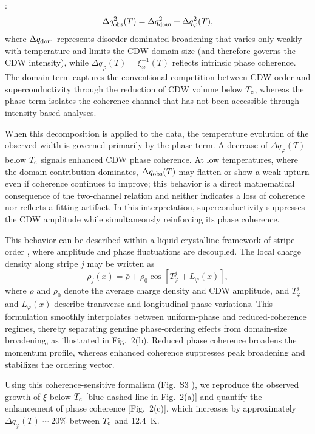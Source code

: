 \documentclass[floatfix,aps,twocolumn,preprintnumbers,superscriptaddress,floatfix,prl]{revtex4-2}
\begin{document}
\cite{supp}:
\begin{equation}
\Delta q_{\rm obs}^{2}(T)
= \Delta q_{\rm dom}^{2}
+ \Delta q_{\varphi}^{2}(T),
\end{equation}
where $\Delta q_{\rm dom}$ represents disorder-dominated broadening that varies only weakly with temperature and limits the CDW domain size (and therefore governs the CDW intensity), while $\Delta q_{\varphi}(T)=\xi_{\varphi}^{-1}(T)$ reflects intrinsic phase coherence. The domain term captures the conventional competition between CDW order and superconductivity through the reduction of CDW volume below $T_{\rm c}$, whereas the phase term isolates the coherence channel that has not been accessible through intensity-based analyses.

When this decomposition is applied to the data, the temperature evolution of the observed width is governed primarily by the phase term. A decrease of $\Delta q_{\varphi}(T)$ below $T_{\rm c}$ signals enhanced CDW phase coherence. At low temperatures, where the domain contribution dominates, $\Delta q_{\rm obs}(T)$ may flatten or show a weak upturn even if coherence continues to improve; this behavior is a direct mathematical consequence of the two-channel relation and neither indicates a loss of coherence nor reflects a fitting artifact. In this interpretation, superconductivity suppresses the CDW amplitude while simultaneously reinforcing its phase coherence.


This behavior can be described within a liquid-crystalline framework of stripe order \cite{Kivelson1,McMillan1976,TonerNelson1981,Zachar1998}, where amplitude and phase fluctuations are decoupled. The local charge density along stripe $j$ may be written as
\[
\rho_j(x)
= \bar{\rho}
+ \rho_0 \cos\!\left[T_{\varphi}^j + L_{\varphi}(x)\right],
\]
where $\bar{\rho}$ and $\rho_0$ denote the average charge density and CDW amplitude, and $T_{\varphi}^j$ and $L_{\varphi}(x)$ describe transverse and longitudinal phase variations. This formulation smoothly interpolates between uniform-phase and reduced-coherence regimes, thereby separating genuine phase-ordering effects from domain-size broadening, as illustrated in Fig.~2(b). Reduced phase coherence broadens the momentum profile, whereas enhanced coherence suppresses peak broadening and stabilizes the ordering vector.

Using this coherence-sensitive formalism (Fig.~S3 \cite{supp}), we reproduce the observed growth of $\xi$ below $T_{\rm c}$ [blue dashed line in Fig.~2(a)] and quantify the enhancement of phase coherence [Fig.~2(c)], which increases by approximately $\Delta q_{\varphi}(T)\sim 20\%$ between $T_{\rm c}$ and 12.4~K.
\end{document}

